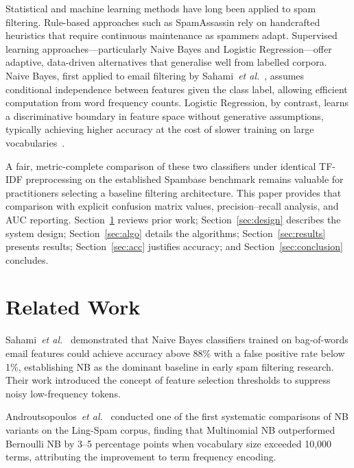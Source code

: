 \documentclass[conference,letterpaper]{IEEEtran}
\begin{document}
Statistical and machine learning methods have long been applied to spam filtering. Rule-based
approaches such as SpamAssassin rely on handcrafted heuristics that require continuous maintenance
as spammers adapt. Supervised learning approaches---particularly Naive Bayes and Logistic
Regression---offer adaptive, data-driven alternatives that generalise well from labelled corpora.
Naive Bayes, first applied to email filtering by Sahami~\textit{et al.}~\cite{sahami1998}, assumes
conditional independence between features given the class label, allowing efficient computation from
word frequency counts. Logistic Regression, by contrast, learns a discriminative boundary in
feature space without generative assumptions, typically achieving higher accuracy at the cost of
slower training on large vocabularies~\cite{bishop2006}.

A fair, metric-complete comparison of these two classifiers under identical TF-IDF preprocessing
on the established Spambase benchmark remains valuable for practitioners selecting a baseline
filtering architecture. This paper provides that comparison with explicit confusion matrix values,
precision--recall analysis, and AUC reporting. Section~\ref{sec:related} reviews prior work;
Section~\ref{sec:design} describes the system design; Section~\ref{sec:algo} details the
algorithms; Section~\ref{sec:results} presents results; Section~\ref{sec:acc} justifies accuracy;
and Section~\ref{sec:conclusion} concludes.

\section{Related Work}
\label{sec:related}

Sahami~\textit{et al.}~\cite{sahami1998} demonstrated that Naive Bayes classifiers trained on
bag-of-words email features could achieve accuracy above 88\% with a false positive rate below 1\%,
establishing NB as the dominant baseline in early spam filtering research. Their work introduced
the concept of feature selection thresholds to suppress noisy low-frequency tokens.

Androutsopoulos~\textit{et al.}~\cite{androutsopoulos2000} conducted one of the first systematic
comparisons of NB variants on the Ling-Spam corpus, finding that Multinomial NB outperformed
Bernoulli NB by 3--5 percentage points when vocabulary size exceeded 10,000 terms, attributing the
improvement to term frequency encoding.
\end{document}
